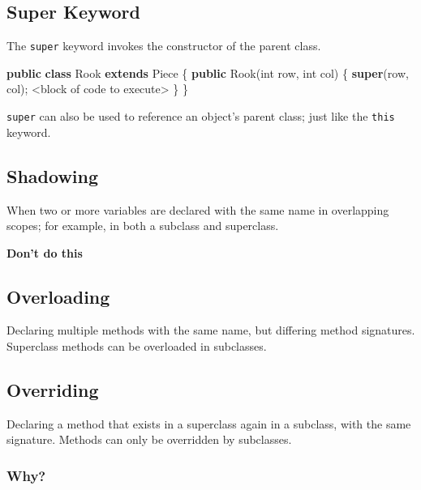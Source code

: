 \documentclass[]{article}
\newenvironment{Shaded}{}{}
\newcommand{\DataTypeTok}[1]{\textcolor[rgb]{0.56,0.13,0.00}{#1}}
\newcommand{\FunctionTok}[1]{\textcolor[rgb]{0.02,0.16,0.49}{#1}}
\newcommand{\KeywordTok}[1]{\textcolor[rgb]{0.00,0.44,0.13}{\textbf{#1}}}
\newcommand{\NormalTok}[1]{#1}
\begin{document}
\hypertarget{super-keyword}{%
\subsection{Super Keyword}\label{super-keyword}}

The \texttt{super} keyword invokes the constructor of the parent class.

\begin{Shaded}
\begin{Highlighting}[]
\KeywordTok{public} \KeywordTok{class}\NormalTok{ Rook }\KeywordTok{extends}\NormalTok{ Piece \{}
    \KeywordTok{public} \FunctionTok{Rook}\NormalTok{(}\DataTypeTok{int}\NormalTok{ row, }\DataTypeTok{int}\NormalTok{ col) \{}
        \KeywordTok{super}\NormalTok{(row, col);}
\NormalTok{        <block of code to execute>}
\NormalTok{    \}}
\NormalTok{\}}
\end{Highlighting}
\end{Shaded}

\texttt{super} can also be used to reference an object's parent class;
just like the \texttt{this} keyword.

\hypertarget{shadowing}{%
\subsection{Shadowing}\label{shadowing}}

When two or more variables are declared with the same name in
overlapping scopes; for example, in both a subclass and superclass.

\textbf{Don't do this}

\hypertarget{overloading-2}{%
\subsection{Overloading}\label{overloading-2}}

Declaring multiple methods with the same name, but differing method
signatures. Superclass methods can be overloaded in subclasses.

\hypertarget{overriding}{%
\subsection{Overriding}\label{overriding}}

Declaring a method that exists in a superclass again in a subclass, with
the same signature. Methods can only be overridden by subclasses.

\hypertarget{why}{%
\subsubsection{Why?}\label{why}}
\end{document}
